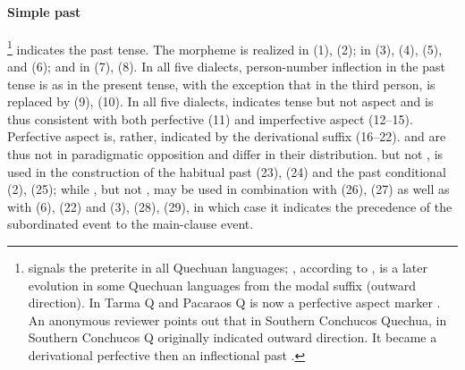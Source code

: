 \paragraph{Simple past }\label{par:simplepast}
\footnote{ signals the preterite in all Quechuan languages; , according to \citet{CerroP87}, is a later evolution in some Quechuan languages from the modal suffix  (outward direction). In Tarma Q and Pacaraos Q  is now a perfective aspect marker \citet[18--29]{Adelaar88}. An anonymous reviewer points out that in Southern Conchucos Quechua,  in Southern Conchucos Q originally indicated outward direction. It became a derivational perfective then an inflectional past \citep[see][192--197]{Hintz}.} indicates the past tense. The morpheme is realized  in \AMV{} (1), (2);  in \ACH{} (3), \LT{} (4), (5), and \SP{} (6); and  in \CH{} (7), (8). In all five dialects, person-number inflection in the past tense is as in the present tense, with the exception that in the third person,  is replaced by \phono{-\uo} (9), (10). In all five dialects,  indicates tense but not aspect and is thus consistent with both perfective (11) and imperfective aspect (12--15). Perfective aspect is, rather, indicated by the derivational suffix  (16--22).  and  are thus not in paradigmatic opposition and differ in their distribution.  but not , is used in the construction of the habitual past (23), (24) and the past conditional (2), (25); while , but not , may be used in combination with  (26), (27) as well as with  (6), (22) and  (3), (28), (29), in which case it indicates the precedence of the subordinated event to the main-clause event. 

